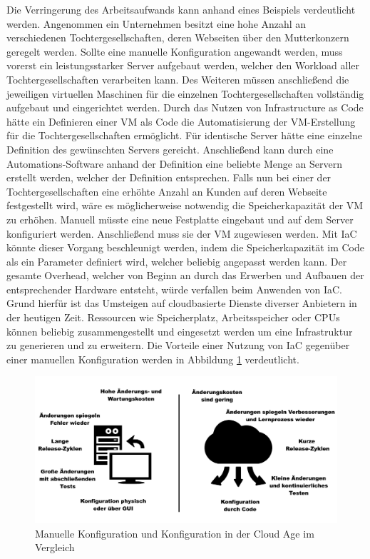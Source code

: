 \documentclass[biblatex]{lni}
\begin{document}
Die Verringerung des Arbeitsaufwands kann anhand eines Beispiels verdeutlicht werden. Angenommen ein Unternehmen besitzt eine hohe Anzahl an verschiedenen Tochtergesellschaften, deren Webseiten über den Mutterkonzern geregelt werden. Sollte eine manuelle Konfiguration angewandt werden, muss vorerst ein leistungsstarker Server aufgebaut werden, welcher den Workload aller Tochtergesellschaften verarbeiten kann. Des Weiteren müssen anschließend die jeweiligen virtuellen Maschinen für die einzelnen Tochtergesellschaften vollständig aufgebaut und eingerichtet werden. Durch das Nutzen von Infrastructure as Code hätte ein Definieren einer VM als Code die Automatisierung der VM-Erstellung für die Tochtergesellschaften ermöglicht. Für identische Server hätte eine einzelne Definition des gewünschten Servers gereicht. Anschließend kann durch eine Automations-Software anhand der Definition eine beliebte Menge an Servern erstellt werden, welcher der Definition entsprechen. Falls nun bei einer der Tochtergesellschaften eine erhöhte Anzahl an Kunden auf deren Webseite festgestellt wird, wäre es möglicherweise notwendig die Speicherkapazität der VM zu erhöhen. Manuell müsste eine neue Festplatte eingebaut und auf dem Server konfiguriert werden. Anschließend muss sie der VM zugewiesen werden. Mit IaC könnte dieser Vorgang beschleunigt werden, indem die Speicherkapazität im Code als ein Parameter definiert wird, welcher beliebig angepasst werden kann. Der gesamte Overhead, welcher von Beginn an durch das Erwerben und Aufbauen der entsprechender Hardware entsteht, würde verfallen beim Anwenden von IaC. Grund hierfür ist das Umsteigen auf cloudbasierte Dienste diverser Anbietern in der heutigen Zeit. Ressourcen wie Speicherplatz, Arbeitsspeicher oder CPUs können beliebig zusammengestellt und eingesetzt werden um eine Infrastruktur zu generieren und zu erweitern.
Die Vorteile einer Nutzung von IaC gegenüber einer manuellen Konfiguration werden in Abbildung \ref{fig:manualvsca} verdeutlicht. 
\pagebreak
\begin{figure}
    \centering
    \includegraphics[width=12cm]{iac.png}
    \caption{Manuelle Konfiguration und Konfiguration in der Cloud Age im Vergleich \cite{Morris.December2020}}
    \label{fig:manualvsca}
\end{figure}\\
\end{document}
